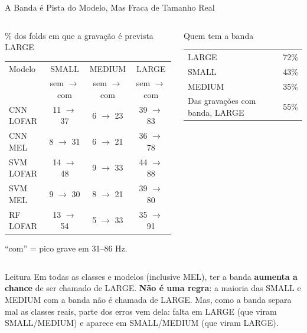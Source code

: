\documentclass[aspectratio=169]{beamer}
\begin{document}
\begin{frame}{A Banda é Pista do Modelo, Mas Fraca de Tamanho Real}
    \footnotesize
    \begin{columns}[t]
        \begin{block}{\small \% dos folds em que a gravação é prevista LARGE}
            \scriptsize
            \centering
            \setlength{\tabcolsep}{4pt}
            \begin{tabular}{lccc}
            \toprule
            Modelo & SMALL & MEDIUM & LARGE \\
             & sem $\to$ com & sem $\to$ com & sem $\to$ com \\
            \midrule
            CNN LOFAR & 11 $\to$ 37 & 6 $\to$ 23 & 39 $\to$ 83 \\
            CNN MEL & 8 $\to$ 31 & 6 $\to$ 21 & 36 $\to$ 78 \\
            SVM LOFAR & 14 $\to$ 48 & 9 $\to$ 33 & 44 $\to$ 88 \\
            SVM MEL & 9 $\to$ 30 & 8 $\to$ 21 & 39 $\to$ 80 \\
            RF LOFAR & 13 $\to$ 54 & 5 $\to$ 33 & 35 $\to$ 91 \\
            \bottomrule
            \end{tabular}

            \vspace{0.05cm}
            {\tiny ``com'' = pico grave em 31--86 Hz.\par}
        \end{block}
        \begin{block}{\small Quem tem a banda}
            \scriptsize
            \centering
            \begin{tabular}{lc}
            \toprule
            LARGE & 72\% \\
            SMALL & 43\% \\
            MEDIUM & 35\% \\
            \midrule
            Das gravações com banda, LARGE & 55\% \\
            \bottomrule
            \end{tabular}
        \end{block}
    \end{columns}
    \vspace{0.1cm}
    \begin{alertblock}{Leitura}
        \scriptsize
        Em todas as classes e modelos (inclusive MEL), ter a banda \textbf{aumenta a chance} de ser chamado de LARGE. \textbf{Não é uma regra}: a maioria das SMALL e MEDIUM com a banda não é chamada de LARGE. Mas, como a banda separa mal as classes reais, parte dos erros vem dela: falta em LARGE (que viram SMALL/MEDIUM) e aparece em SMALL/MEDIUM (que viram LARGE).
    \end{alertblock}
\end{frame}
\end{document}
